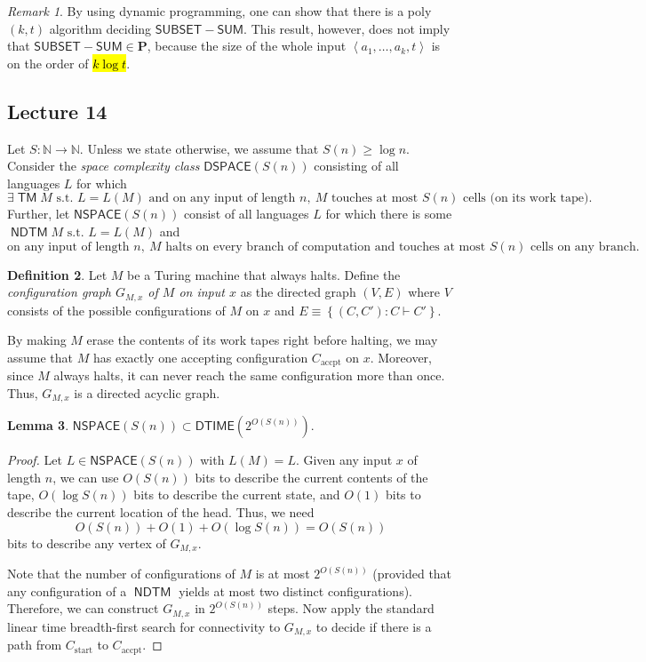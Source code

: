 \documentclass[10pt,letterpaper,cm]{nupset}
\theoremstyle{definition}
\newtheorem{definition}{Definition}[subsection]
\theoremstyle{theorem}
\newtheorem{lemma}[definition]{Lemma}
\theoremstyle{remark}
\newtheorem{remark}[definition]{Remark}
\newcommand{\N}{\mathbb N}
\newcommand{\1}{\mathbf{1}}
\newcommand{\accpt}{\mathrm{accpt}}
\newcommand{\0}{\vec 0}
\DeclareMathOperator{\TM}{\mathsf{TM}}
\DeclareMathOperator{\NDTM}{\mathsf{NDTM}}
\begin{document}
\begin{remark}
By using dynamic programming, one can show that there is a poly$\left(k, t\right)$ algorithm deciding $\mathsf{SUBSET{-}SUM}$. This result, however, does not imply that $\mathsf{SUBSET{-}SUM} \in \mathbf{P}$, because the size of the whole input $\left\langle a_1, \ldots, a_k, t\right\rangle$ is on the order of \hl{$k\log{t}$}.
\end{remark}

\subsection{Lecture 14}

Let $S: \N \to \N$. Unless we state otherwise, we assume that $S(n) \geq \log{n}$.
Consider the \textit{space complexity class} 
$\mathsf{DSPACE}(S(n))$ consisting of all languages $L$ for which $$\exists \TM M\text{ s.t. }L = L(M) \text{ and on any input of length }n,\ M \text{ touches at most }S(n)\text{ cells (on its work tape)}.$$
Further, let $\mathsf{NSPACE}(S(n))$ consist of all languages $L$ for which  there is some $\NDTM M\text{ s.t. } L = L(M)$ and
\[
\text{on any input of length }n,\ M\text{ halts on every branch of computation and touches at most }S(n)\text{ cells on any branch}.
\]


\begin{definition}\label{Configg}
Let $M$ be a Turing machine that always halts. Define the \textit{configuration graph $G_{M,x}$ of $M$ on input $x$} as the directed graph $\left(V, E\right)$ where $V$ consists of the possible configurations of $M$ on $x$ and $E \equiv \left\{\left(C,C'\right) : C \vdash C'\right\}$.
\end{definition}

 By making $M$ erase the contents of its work tapes right before halting, we may assume that $M$ has exactly one accepting configuration $C_{\accpt}$ on $x$.
Moreover,
since $M$ always halts, it can never reach the same configuration more than once. Thus, $G_{M,x}$ is a directed acyclic graph.  


\begin{lemma}
$\mathsf{NSPACE}(S(n)) \subset \mathsf{DTIME}\left(2^{O(S(n))}\right)$.
\end{lemma}
\begin{proof}
Let $L \in \mathsf{NSPACE}(S(n)) $ with $L(M) = L$.  Given any input $x$ of length $n$, we can use $O(S(n))$ bits to describe the current contents of the tape, $O(\log{S(n)})$ bits to describe the current state, and $O(1)$ bits to describe the current location of the head. Thus, we need $$O(S(n)) + O(1) + O(\log{S(n)})= O(S(n))$$ bits to describe any vertex of $G_{M,x}$. 

Note that the number of configurations of $M$ is at most $2^{O(S(n))}$ (provided that any configuration of a $\NDTM$ yields at most two distinct configurations).  Therefore, we can construct $G_{M,x}$ in $2^{O(S(n))}$ steps. Now apply the standard linear time breadth-first search for connectivity to $G_{M,x}$ to decide if there is a path from $C_{\mathrm{start}}$ to $C_{\accpt}$. 
\end{proof}
\end{document}
